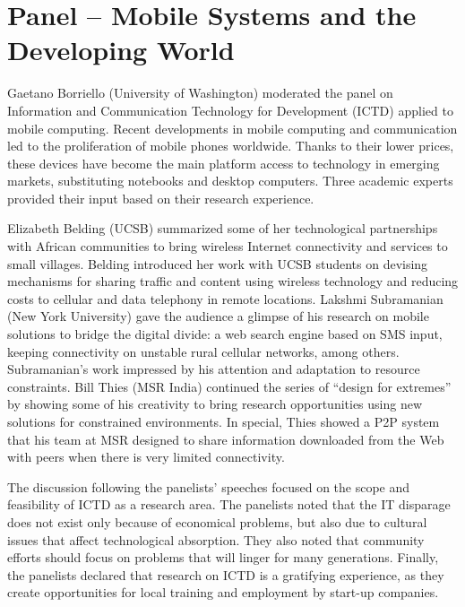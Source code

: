 \section{Panel -- Mobile Systems and the Developing World}
\label{sec:panel}

Gaetano Borriello (University of Washington) moderated the panel on
Information and Communication Technology for Development (ICTD) applied
to mobile computing. Recent developments in mobile computing and
communication led to the proliferation of mobile phones worldwide.
Thanks to their lower prices, these devices have become the main
platform access to technology in emerging markets, substituting
notebooks and desktop computers. Three academic experts provided their
input based on their research experience.

Elizabeth Belding (UCSB) summarized some of her technological
partnerships with African communities to bring wireless Internet
connectivity and services to small villages. Belding introduced her work
with UCSB students on devising mechanisms for sharing traffic and
content using wireless technology and reducing costs to cellular and
data telephony in remote locations. Lakshmi Subramanian (New York
University) gave the audience a glimpse of his research on mobile
solutions to bridge the digital divide: a web search engine based on SMS
input, keeping connectivity on unstable rural cellular networks, among
others. Subramanian's work impressed by his attention and adaptation to
resource constraints. Bill Thies (MSR India) continued the series of
``design for extremes'' by showing some of his creativity to bring
research opportunities using new solutions for constrained environments.
In special, Thies showed a P2P system that his team at MSR designed to
share information downloaded from the Web with peers when there is very
limited connectivity.

The discussion following the panelists' speeches focused on the scope
and feasibility of ICTD as a research area. The panelists noted that the
IT disparage does not exist only because of economical problems, but
also due to cultural issues that affect technological absorption. They
also noted that community efforts should focus on problems that will
linger for many generations. Finally, the panelists declared that
research on ICTD is a gratifying experience, as they create
opportunities for local training and employment by start-up companies.
